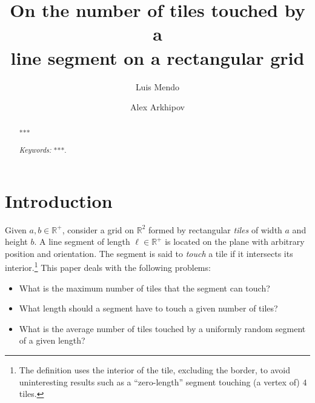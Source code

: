 \documentclass[12pt, a4paper]{article}
\newcommand{\len}{\ell} %
\begin{document}
\title{
On the number of tiles touched by a\\
line segment on a rectangular grid
}


\author[1]{Luis Mendo}
\author[2]{Alex Arkhipov}




\maketitle

\begin{abstract}
***

\emph{Keywords:} ***.

\end{abstract}


\section{Introduction}
\label{part: intro}

Given $a, b \in \mathbb R^+$, consider a grid on $\mathbb R^2$ formed by rectangular \emph{tiles} of width $a$ and height $b$. A line segment of length $\len \in \mathbb R^+$ is located on the plane with arbitrary position and orientation. The segment is said to \emph{touch} a tile if it intersects its interior.\footnote{
The definition uses the interior of the tile, excluding the border, to avoid uninteresting results such as a ``zero-length'' segment touching (a vertex of) $4$ tiles.} This paper deals with the following problems:
\begin{itemize}
\item What is the maximum number of tiles that the segment can touch?
\item What length should a segment have to touch a given number of tiles?
\item What is the average number of tiles touched by a uniformly random segment of a given length?
\end{itemize}
\end{document}
